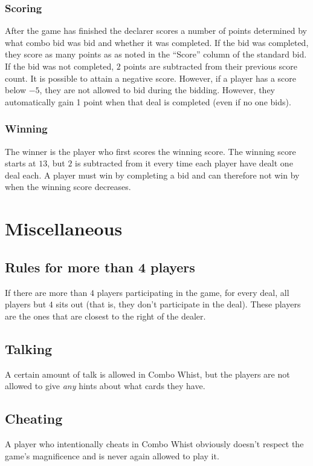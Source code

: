 \documentclass[a4paper]{article}
\begin{document}
{{			\subsubsection{Scoring}{%
				After the game has finished the declarer scores a number of points determined by what combo bid was bid and whether it was completed. If the bid was completed, they score as many points as as noted in the ``Score'' column of the standard bid. If the bid was not completed, $2$ points are subtracted from their previous score count. It is possible to attain a negative score. However, if a player has a score below $-5$, they are not allowed to bid during the bidding. However, they automatically gain 1 point when that deal is completed (even if no one bids).
			}

			\subsubsection{Winning}{%
				The winner is the player who first scores the winning score. The winning score starts at $13$, but $2$ is subtracted from it every time each player have dealt one deal each. A player must win by completing a bid and can therefore not win by when the winning score decreases.
			}
		}
	}

	\section{Miscellaneous}{%
		\subsection{Rules for more than 4 players}{%
			If there are more than $4$ players participating in the game, for every deal, all players but $4$ sits out (that is, they don't participate in the deal). These players are the ones that are closest to the right of the dealer.
			
			
		}
		
		\subsection{Talking}{%
			A certain amount of talk is allowed in Combo Whist, but the players are not allowed to give \emph{any} hints about what cards they have.
		}
		
		\subsection{Cheating}{%
			A player who intentionally cheats in Combo Whist obviously doesn't respect the game's magnificence and is never again allowed to play it.
		}
	}
\end{document}
